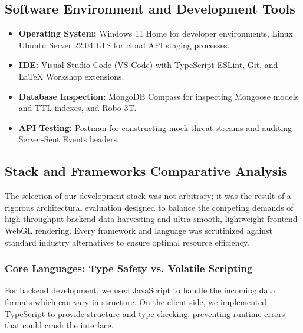 \subsection{Software Environment and Development Tools}
\begin{itemize}
    \item \textbf{Operating System:} Windows 11 Home for developer environments, Linux Ubuntu Server 22.04 LTS for cloud API staging processes.
    \item \textbf{IDE:} Visual Studio Code (VS Code) with TypeScript ESLint, Git, and LaTeX Workshop extensions.
    \item \textbf{Database Inspection:} MongoDB Compass for inspecting Mongoose models and TTL indexes, and Robo 3T.
    \item \textbf{API Testing:} Postman for constructing mock threat streams and auditing Server-Sent Events headers.
\end{itemize}

\subsection{Stack and Frameworks Comparative Analysis}
The selection of our development stack was not arbitrary; it was the result of a rigorous architectural evaluation designed to balance the competing demands of high-throughput backend data harvesting and ultra-smooth, lightweight frontend WebGL rendering. Every framework and language was scrutinized against standard industry alternatives to ensure optimal resource efficiency.

\subsubsection{Core Languages: Type Safety vs. Volatile Scripting}
For backend development, we used JavaScript to handle the incoming data formats which can vary in structure. On the client side, we implemented TypeScript to provide structure and type-checking, preventing runtime errors that could crash the interface.

